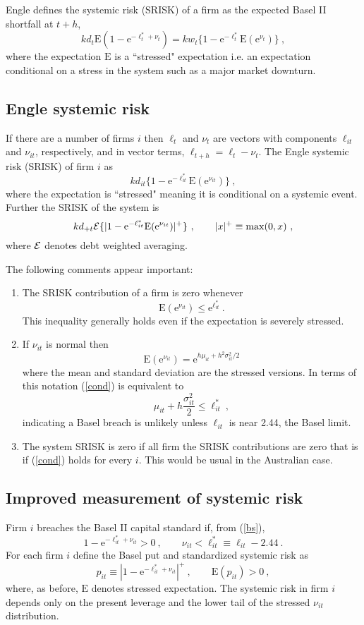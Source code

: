 \documentclass[authoryear]{elsarticle}
\newcommand{\E}{\mathrm{E}}
\newcommand{\e}{\mathrm{e}}
\newcommand{\Ex}{{\cal E}}
\newcommand{\eref}[1]{(\ref{#1})}
\newcommand{\cq}{\ , \qquad}
\newcommand{\be}[1]{\begin{equation}\label{#1}}
\newcommand{\ee}{\end{equation}}
\begin{document}
Engle defines the systemic risk (SRISK) of a firm as the expected Basel II shortfall at $t+h$,
$$
k d_t\E(1-\e^{-\ell^*_t+\nu_t}) =  kw_t\{1-\e^{-\ell^*_t}\E(\e^{\nu_t})\}\ ,
$$
where the expectation $\E$ is a ``stressed" expectation i.e. an expectation conditional on a stress in the system such as a major market downturn.




\subsection{Engle systemic risk}
If there are a number of  firms $i$ then $\ell_t$ and $\nu_t$ are  vectors with components $\ell_{it}$ and $\nu_{it}$, respectively, and in vector terms, $\ell_{t+h}=\ell_t - \nu_t$.   The Engle systemic risk (SRISK) of  firm $i$ as 
\be{esrisk}
 kd_{it}\{1-\e^{-\ell^*_{it}}\E(\e^{\nu_{it}})\}\ ,
\ee
where the expectation is ``stressed" meaning it is conditional on a systemic event.  Further the SRISK of the system is
\be{essrisk}
kd_{+t}\Ex\{|1-\e^{-\ell^*_{it}}\E(\e^{\nu_{it}})|^+\}\cq |x|^+\equiv \max(0,x) \ ,
\ee
where $\Ex$ denotes debt weighted averaging.

The following comments appear important:
\begin{enumerate}
\item The SRISK contribution of a firm is zero whenever
\be{cond}
\E(\e^{\nu_{it}})\le\e^{\ell^*_{it}}\ .
\ee
This inequality generally holds even if the expectation is severely stressed. 
\item  If $\nu_{it}$ is normal then 
$$
\E(\e^{\nu_{it}}) = \e^{h\mu_{it} +h^2\sigma^2_{it}/2}
$$
where the mean and standard deviation are the stressed versions.  In terms of this notation \eref{cond}
is equivalent to
$$
\mu_{it} +h\frac{\sigma^2_{it}}{2}\le \ell_{it}^* \ ,
$$
indicating a Basel breach is unlikely unless $\ell_{it}$ is near 2.44, the Basel limit.

\item The system SRISK is zero if all firm the SRISK contributions are zero that is if \eref{cond} holds for every $i$.  This would be usual in the Australian case.
\end{enumerate}

\subsection{Improved measurement of systemic risk}

Firm $i$ breaches the Basel II capital standard if, from \eref{bs},
$$
1-\e^{-\ell^*_{it}+\nu_{it}} >0 \cq \nu_{it}< \ell_{it}^*\equiv \ell_{it}-2.44  \ .
$$
For each firm $i$ define the  Basel put and standardized systemic risk as 
\be{put}
p_{it}\equiv  |1-\e^{-\ell^*_{it}+\nu_{it}}|^+\cq \E(p_{it})>0\ ,
\ee
where, as before, $\E$ denotes stressed expectation.  The systemic risk in firm $i$ depends only on the present leverage  and the lower tail of the stressed $\nu_{it}$ distribution.
\end{document}

